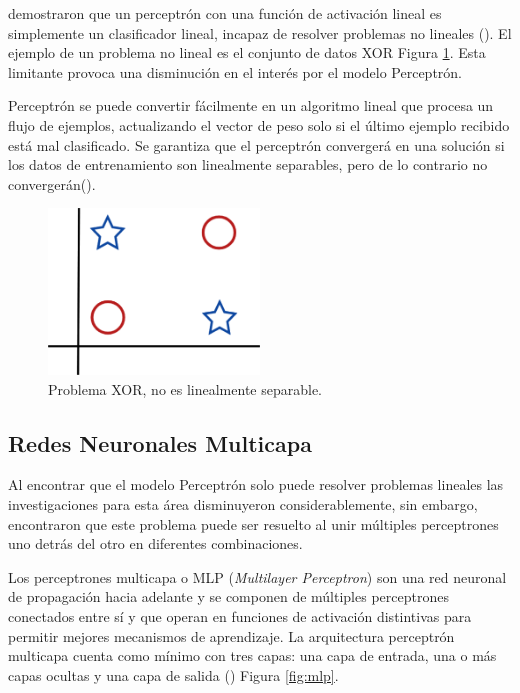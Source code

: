 \citeauthor{minsky1969Perceptrons} demostraron que un perceptrón con una función de activación lineal es simplemente un clasificador lineal, incapaz de resolver problemas no lineales (\cite{rosebrock2017deep}). El ejemplo de un problema no lineal es el conjunto de datos XOR Figura \ref{fig:xor}. Esta limitante provoca una disminución en el interés por el modelo Perceptrón.

Perceptrón se puede convertir fácilmente en un algoritmo lineal que procesa un flujo de ejemplos, actualizando el vector de peso solo si el último ejemplo recibido está mal clasificado. Se garantiza que el perceptrón convergerá en una solución si los datos de entrenamiento son linealmente separables, pero de lo contrario no convergerán(\cite{flach2012Machine}).

\begin{figure}[H]
    \centering
    \includegraphics[width=0.5\textwidth]{MarcoTeorico/imgs/XOR.png}
    \caption{Problema XOR, no es linealmente separable.}
    \label{fig:xor}
\end{figure}


\subsection{Redes Neuronales Multicapa}


Al encontrar que el modelo Perceptrón solo puede resolver problemas lineales las investigaciones para esta área disminuyeron considerablemente, sin embargo, \citeauthor{rumelhart1986Parallel} encontraron que este problema puede ser resuelto al unir múltiples perceptrones uno detrás del otro en diferentes combinaciones.

Los perceptrones multicapa o MLP (\textit{Multilayer Perceptron}) son una red neuronal de propagación hacia adelante y se componen de múltiples perceptrones conectados entre sí y que operan en funciones de activación distintivas para permitir mejores mecanismos de aprendizaje. La arquitectura perceptrón multicapa cuenta como mínimo con tres capas: una capa de entrada, una o más capas ocultas y una capa de salida (\cite{swamynathan2017Mastering}) Figura \ref{fig:mlp}.

